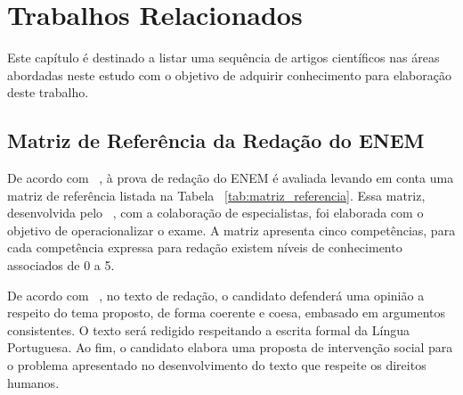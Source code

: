 \chapter{Trabalhos Relacionados}\label{trab_rela}

Este capítulo é destinado a listar uma sequência de artigos científicos nas áreas abordadas neste estudo com o objetivo de adquirir conhecimento para elaboração deste trabalho.

\section{Matriz de Referência da Redação do ENEM}

De acordo com ~\cite{silvio_taynan:2017}, à prova de redação do ENEM é avaliada levando em conta uma matriz de referência listada na Tabela ~\ref{tab:matriz_referencia}. Essa matriz, desenvolvida pelo ~\cite{edital_enem:2016}, com a colaboração de especialistas, foi elaborada com o objetivo de operacionalizar o exame. A matriz apresenta cinco competências, para cada competência expressa para redação existem níveis de conhecimento associados de 0 a 5.

De acordo com ~\cite{braga:2015}, no texto de redação, o candidato defenderá uma opinião a respeito do tema proposto, de forma coerente e coesa, embasado em argumentos consistentes. O texto será redigido respeitando a escrita formal da Língua Portuguesa. Ao fim, o candidato elabora uma proposta de intervenção social para o problema apresentado no desenvolvimento do texto que respeite os direitos humanos.

